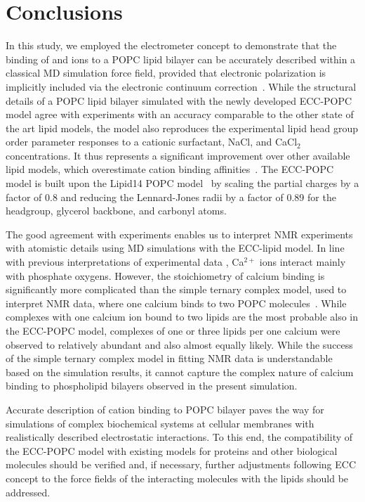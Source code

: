 \documentclass[aip,jcp,twocolumn]{revtex4}
\begin{document}
\section{Conclusions}

In this study, we employed the electrometer concept to demonstrate that the binding of  and  ions to a POPC lipid bilayer can be accurately described within a classical MD simulation force field, provided that electronic polarization is implicitly included via the electronic continuum correction~\cite{leontyev11}. While the structural details of a POPC lipid bilayer simulated with the newly developed ECC-POPC model agree with experiments with an accuracy comparable to the other state of the art lipid models, the model also reproduces the experimental lipid head group order parameter responses to a cationic surfactant, NaCl, and CaCl$_2$ concentrations. It thus represents a significant improvement over other available lipid models, which overestimate cation binding affinities~\cite{catte16}. The ECC-POPC model is built upon the Lipid14 POPC model~\cite{dickson14} by scaling the partial charges by a factor of 0.8 and reducing the Lennard-Jones radii by a factor of 0.89 for the headgroup, glycerol backbone, and carbonyl atoms. 

The good agreement with experiments enables us to interpret NMR experiments with atomistic details using MD simulations with the ECC-lipid model. In line with previous interpretations of experimental data \cite{hauser76,hauser78,herbette84,binder02}, Ca$^{2+}$ ions interact mainly with phosphate oxygens. However, the stoichiometry of calcium binding is significantly more complicated than the simple ternary complex model, used to interpret NMR data, where one calcium binds to two POPC molecules~\cite{altenbach84}. While complexes with one calcium ion bound to two lipids are the most probable also in the ECC-POPC model, complexes of one or three lipids per one calcium were observed to relatively abundant and also almost equally likely. While the success of the simple ternary complex model in fitting NMR data is understandable based on the simulation results, it cannot capture the complex nature of calcium binding to phospholipid bilayers observed in the present simulation.

Accurate description of cation binding to POPC bilayer paves the way for simulations of complex biochemical systems at cellular membranes with realistically described electrostatic interactions. To this end, the compatibility of the ECC-POPC model with existing models for proteins and other biological molecules should be verified and, if necessary, further adjustments following ECC concept to the force fields of the interacting molecules with the lipids should be addressed.
\end{document}
